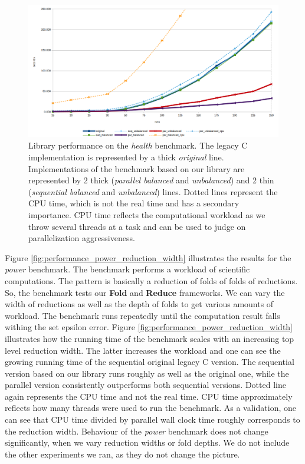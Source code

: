 \begin{figure}[!htb]
\includegraphics[width=1.0\textwidth]{images/health_depth_10.png}
\caption{Library performance on the \textit{health} benchmark. The legacy C implementation is represented by a thick \textit{original} line. Implementations of the benchmark based on our library are represented by 2 thick (\textit{parallel balanced} and \textit{unbalanced}) and 2 thin (\textit{sequential balanced} and \textit{unbalanced}) lines. Dotted lines represent the CPU time, which is not the real time and has a secondary importance. CPU time reflects the computational workload as we throw several threads at a task and can be used to judge on parallelization aggressiveness.}
\label{fig:performance_health}
\end{figure}\newline\null
\quad Figure \ref{fig:performance_power_reduction_width} illustrates the results for the \textit{power} benchmark. The benchmark performs a workload of scientific computations. The pattern is basically a reduction of folds of folds of reductions. So, the benchmark tests our \textbf{Fold} and \textbf{Reduce} frameworks. We can vary the width of reductions as well as the depth of folds to get various amounts of workload. The benchmark runs repeatedly until the computation result falls withing the set epsilon error. Figure \ref{fig:performance_power_reduction_width} illustrates how the running time of the benchmark scales with an increasing top level reduction width. The latter increases the workload and one can see the growing running time of the sequential original legacy C version. The sequential version based on our library runs roughly as well as the original one, while the parallel version consistently outperforms both sequential versions. Dotted line again represents the CPU time and not the real time. CPU time approximately reflects how many threads were used to run the benchmark. As a validation, one can see that CPU time divided by parallel wall clock time roughly corresponds to the reduction width. Behaviour of the \textit{power} benchmark does not change significantly, when we vary reduction widths or fold depths. We do not include the other experiments we ran, as they do not change the picture.
